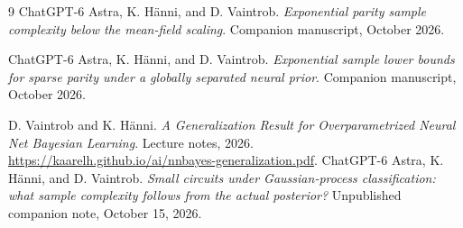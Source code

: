 \documentclass[11pt]{article}
\theoremstyle{remark}
\begin{document}
\begin{thebibliography}{9}
ChatGPT-6 Astra, K. H\"anni, and D. Vaintrob.
\emph{Exponential parity sample complexity below the mean-field scaling}.
Companion manuscript, October 2026.

ChatGPT-6 Astra, K. H\"anni, and D. Vaintrob.
\emph{Exponential sample lower bounds for sparse parity under a globally
separated neural prior}. Companion manuscript, October 2026.

D. Vaintrob and K. H\"anni.
\emph{A Generalization Result for Overparametrized Neural Net Bayesian Learning}.
Lecture notes, 2026.
\url{https://kaarelh.github.io/ai/nnbayes-generalization.pdf}.
ChatGPT-6 Astra, K. H\"anni, and D. Vaintrob.
\emph{Small circuits under Gaussian-process classification:
what sample complexity follows from the actual posterior?}
Unpublished companion note, October 15, 2026.
\end{thebibliography}
\end{document}
